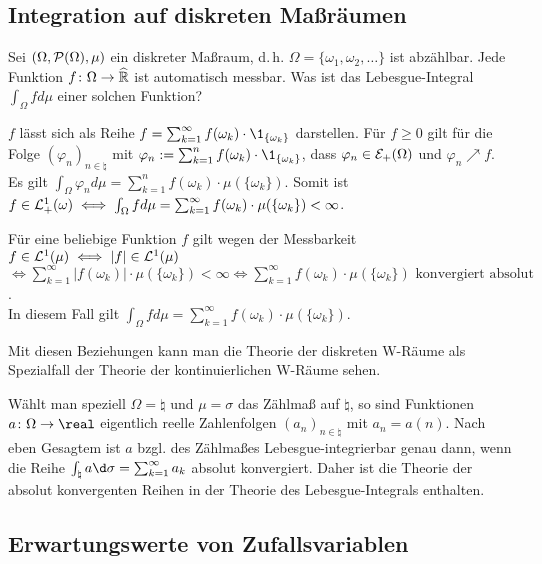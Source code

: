 \subsection{%
    Integration auf diskreten Maßräumen%
}

\begin{Bem}
    Sei $(\Omega, \P(\Omega), \mu)$ ein diskreter Maßraum, d.\,h.
    $\Omega = \{\omega_1, \omega_2, \dotsc\}$ ist abzählbar.
    Jede Funktion $f\colon \Omega \rightarrow \extreal$ ist automatisch messbar.
    Was ist das Lebesgue-Integral $\int_\Omega f d\mu$ einer solchen Funktion?
    
    $f$ lässt sich als Reihe $f = \sum_{k=1}^\infty f(\omega_k) \cdot \1_{\{\omega_k\}}$
    darstellen.
    Für $f \ge 0$ gilt für die Folge $(\varphi_n)_{n \in \natural}$ mit
    $\varphi_n := \sum_{k=1}^n f(\omega_k) \cdot \1_{\{\omega_k\}}$,
    dass $\varphi_n \in \E_+(\Omega)$ und $\varphi_n \nearrow f$.
    Es gilt $\int_\Omega \varphi_n d\mu = \sum_{k=1}^n f(\omega_k) \cdot \mu(\{\omega_k\})$.
    Somit ist $f \in \L^1_+(\omega) \iff
    \int_\Omega f d\mu = \sum_{k=1}^\infty f(\omega_k) \cdot \mu(\{\omega_k\}) < \infty$.
    
    Für eine beliebige Funktion $f$ gilt wegen der Messbarkeit
    $f \in \L^1(\mu) \iff |f| \in \L^1(\mu)$
    $\iff \sum_{k=1}^\infty |f(\omega_k)| \cdot \mu(\{\omega_k\}) < \infty \iff
    \sum_{k=1}^\infty f(\omega_k) \cdot \mu(\{\omega_k\}) \text{ konvergiert absolut}$.\\
    In diesem Fall gilt
    $\int_\Omega f d\mu = \sum_{k=1}^\infty f(\omega_k) \cdot \mu(\{\omega_k\})$.
    
    Mit diesen Beziehungen kann man die Theorie der diskreten W-Räume als Spezialfall der Theorie
    der kontinuierlichen W-Räume sehen.
    
    Wählt man speziell $\Omega = \natural$ und $\mu = \sigma$ das Zählmaß auf $\natural$,
    so sind Funktionen $a\colon \Omega \rightarrow \real$ eigentlich reelle Zahlenfolgen
    $(a_n)_{n \in \natural}$ mit $a_n = a(n)$.
    Nach eben Gesagtem ist $a$ bzgl. des Zählmaßes Lebesgue-integrierbar genau dann, wenn
    die Reihe $\int_\natural a \d\sigma = \sum_{k=1}^\infty a_k$ absolut konvergiert.
    Daher ist die Theorie der absolut konvergenten Reihen in der Theorie des
    Lebesgue-Integrals enthalten.
\end{Bem}

\pagebreak

\subsection{%
    Erwartungswerte von Zufallsvariablen%
}

